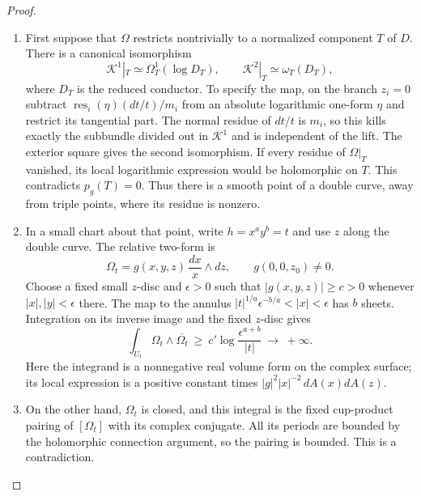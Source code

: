 \begin{proof}
\begin{enumerate}[leftmargin=*]
\item First suppose that $\Omega$ restricts nontrivially to a normalized
component $T$ of $D$. There is a canonical isomorphism
\[
 \mathscr K^1|_T\simeq\Omega_T^1(\log D_T),\qquad
 \mathscr K^2|_T\simeq\omega_T(D_T),
\]
where $D_T$ is the reduced conductor. To specify the map, on the
branch $z_i=0$ subtract
$\operatorname{res}_i(\eta)(dt/t)/m_i$ from an absolute logarithmic
one-form $\eta$ and restrict its tangential part. The normal
residue of $dt/t$ is $m_i$, so this kills exactly the subbundle
divided out in $\mathscr K^1$ and is independent of the lift.
The exterior square gives the second isomorphism. If every
residue of $\Omega|_T$ vanished, its local logarithmic expression
would be holomorphic on $T$. This contradicts $p_g(T)=0$.
Thus there is a smooth point of a double curve, away from triple
points, where its residue is nonzero.

\item In a small chart about that point, write $h=x^ay^b=t$ and use $z$
along the double curve. The relative two-form is
\[
 \Omega_t=g(x,y,z)\,\frac{dx}{x}\wedge dz,
 \qquad g(0,0,z_0)\ne0.
\]
Choose a fixed small $z$-disc and $\epsilon>0$ such that
$|g(x,y,z)|\ge c>0$ whenever $|x|,|y|<\epsilon$ there.
The map to the annulus
$|t|^{1/a}\epsilon^{-b/a}<|x|<\epsilon$
has $b$ sheets. Integration on its inverse image and the fixed
$z$-disc gives
\[
 \int_{U_t}\Omega_t\wedge\overline{\Omega_t}
 \ \ge\ c'\log\frac{\epsilon^{a+b}}{|t|}
 \ \longrightarrow\ +\infty.
\]
Here the integrand is a nonnegative real volume form on the
complex surface; its local expression is a positive constant
times $|g|^2|x|^{-2}\,dA(x)dA(z)$.

\item On the other hand, $\Omega_t$ is closed, and this integral is
the fixed cup-product pairing of $[\Omega_t]$ with its complex
conjugate. All its periods are bounded by the holomorphic
connection argument, so the pairing is bounded. This is a
contradiction.


\end{enumerate}
\end{proof}
